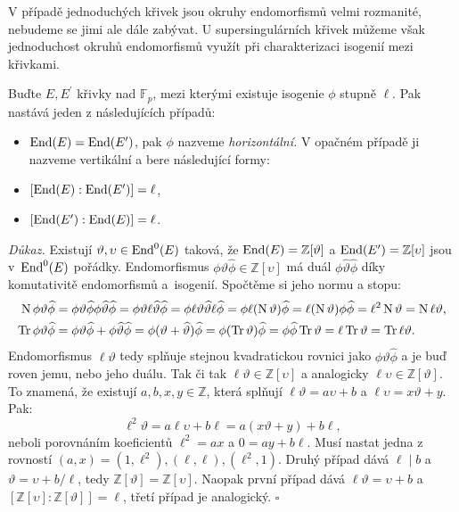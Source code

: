 \documentclass[12pt]{report}
\begin{document}
V případě jednoduchých křivek jsou okruhy endomorfismů velmi rozmanité, nebudeme se jimi ale dále zabývat. U supersingulárních křivek můžeme však jednoduchost okruhů endomorfismů využít při charakterizaci isogenií mezi křivkami.

\begin{veta}\label{cond}
Buďte $E,E^\prime$ křivky nad $\mathbb{F}_p$, mezi kterými existuje isogenie $\phi$ stupně $\ell$. Pak nastává jeden z následujících případů:
\begin{itemize}
\item $\operatorname{End}(E) = \operatorname{End}(E^\prime)$, pak $\phi$ nazveme \textit{horizontální.} V opačném případě ji nazveme vertikální a bere následující formy:
\item $[\operatorname{End}(E) : \operatorname{End}(E^\prime)] = \ell$,
\item $[\operatorname{End}(E^\prime) : \operatorname{End}(E)] = \ell$.
\end{itemize}
\end{veta}
\noindent \textit{Důkaz.} Existují $\vartheta,\upsilon \in \operatorname{End}^0 (E)$ taková, že $\operatorname{End}(E) = \mathbb{Z}[\vartheta]$ a $\operatorname{End}(E^\prime) = \mathbb{Z}[\upsilon]$ jsou v~$\operatorname{End} ^0 (E)$ pořádky. Endomorfismus $\phi \vartheta \widehat{\phi} \in \mathbb{Z}[\upsilon]$ má duál $\phi \widehat{\vartheta} \widehat{\phi}$ díky komutativitě endomorfismů a~isogenií. Spočtěme si jeho normu a stopu:
\begin{align*}
\operatorname{N} \phi \vartheta \widehat{\phi} &= \phi \vartheta \widehat{\phi} \phi \widehat{\vartheta} \widehat{\phi} = \phi \vartheta \ell \widehat{\vartheta} \widehat{\phi} = \phi \ell \vartheta \widehat{\vartheta} \ell \widehat{\phi} = \phi \ell (\operatorname{N} \vartheta) \widehat{\phi} = \ell (\operatorname{N} \vartheta) \phi \widehat{\phi} = \ell ^2 \operatorname{N} \vartheta = \operatorname{N} \ell \vartheta,\\
\operatorname{Tr} \phi \vartheta \widehat{\phi} &= \phi \vartheta \widehat{\phi} + \phi \widehat{\vartheta} \widehat{\phi} = \phi (\vartheta + \widehat{\vartheta}) \widehat{\phi} = \phi (\operatorname{Tr}  \vartheta) \widehat{\phi} = \phi \widehat{\phi} \operatorname{Tr} \vartheta = \ell \operatorname{Tr} \vartheta = \operatorname{Tr} \ell \vartheta.
 \end{align*}
 Endomorfismus $\ell \vartheta$ tedy splňuje stejnou kvadratickou rovnici jako $\phi \vartheta \widehat{\phi}$ a je buď roven jemu, nebo jeho duálu. Tak či tak $\ell \vartheta  \in \mathbb{Z} [ \upsilon ]$ a analogicky $\ell \upsilon \in \mathbb{Z} [ \vartheta]$. To znamená, že existují $a,b,x,y \in \mathbb{Z}$, která splňují $\ell \vartheta = a \upsilon + b$ a $\ell \upsilon = x \vartheta + y$. Pak:
\begin{equation*}
\ell^2 \vartheta = a \ell \upsilon + b \ell = a (x \vartheta + y) + b \ell,
\end{equation*}
neboli porovnáním koeficientů $\ell^2 = ax$ a $0 = ay + b \ell$. Musí nastat jedna z rovností $(a,x) = (1,\ell^2), (\ell,\ell), (\ell^2,1)$. Druhý případ dává $ \ell \mid b$ a $\vartheta = \upsilon + b/\ell$, tedy $\mathbb{Z}[\vartheta] = \mathbb{Z}[\upsilon]$. Naopak první případ dává $\ell \vartheta = \upsilon + b$ a $[\mathbb{Z}[\upsilon] : \mathbb{Z}[\vartheta]] = \ell$, třetí případ je analogický. \hfill $\square$\\
\end{document}
